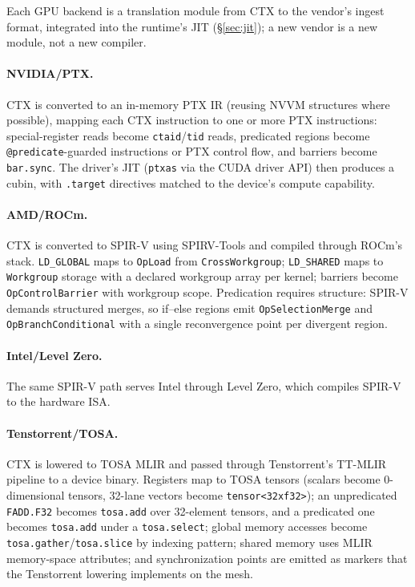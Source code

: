 \documentclass[sigplan,nonacm]{acmart}
\begin{document}
Each GPU backend is a translation module from CTX to the vendor's ingest
format, integrated into the runtime's JIT (\S\ref{sec:jit}); a new vendor is
a new module, not a new compiler.

\paragraph{NVIDIA/PTX.} CTX is converted to an in-memory PTX IR (reusing
NVVM structures where possible), mapping each CTX instruction to one or more
PTX instructions: special-register reads become \texttt{ctaid}/\texttt{tid}
reads, predicated regions become \texttt{@predicate}-guarded instructions or
PTX control flow, and barriers become \texttt{bar.sync}.  The driver's JIT
(\texttt{ptxas} via the CUDA driver API) then produces a cubin, with
\texttt{.target} directives matched to the device's compute capability.

\paragraph{AMD/ROCm.} CTX is converted to SPIR-V using SPIRV-Tools and
compiled through ROCm's stack.  \texttt{LD\_GLOBAL} maps to
\texttt{OpLoad} from \texttt{CrossWorkgroup}; \texttt{LD\_SHARED} maps to
\texttt{Workgroup} storage with a declared workgroup array per kernel;
barriers become \texttt{OpControlBarrier} with workgroup scope.  Predication
requires structure: SPIR-V demands structured merges, so if--else regions
emit \texttt{OpSelectionMerge} and \texttt{OpBranchConditional} with a
single reconvergence point per divergent region.

\paragraph{Intel/Level Zero.} The same SPIR-V path serves Intel through
Level Zero, which compiles SPIR-V to the hardware ISA.

\paragraph{Tenstorrent/TOSA.} CTX is lowered to TOSA MLIR and passed through
Tenstorrent's TT-MLIR pipeline to a device binary.  Registers map to TOSA
tensors (scalars become 0-dimensional tensors, 32-lane vectors become
\texttt{tensor<32xf32>}); an unpredicated \texttt{FADD.F32} becomes
\texttt{tosa.add} over 32-element tensors, and a predicated one becomes
\texttt{tosa.add} under a \texttt{tosa.select}; global memory accesses
become \texttt{tosa.gather}/\texttt{tosa.slice} by indexing pattern; shared
memory uses MLIR memory-space attributes; and synchronization points are
emitted as markers that the Tenstorrent lowering implements on the mesh.
\end{document}
